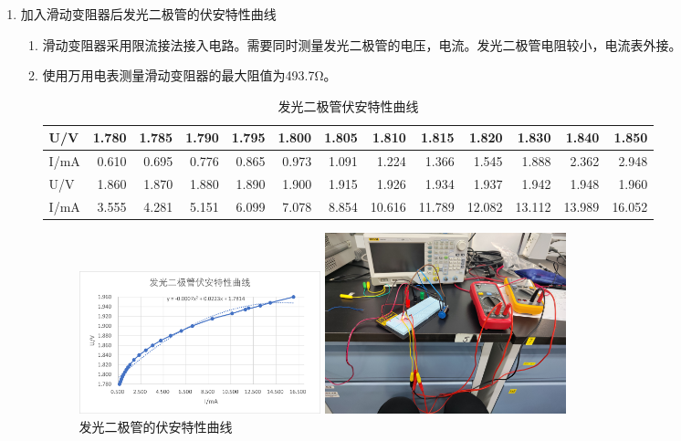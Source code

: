 \documentclass[11pt]{article}
\begin{document}
\begin{enumerate}
    \item 加入滑动变阻器后发光二极管的伏安特性曲线
    \begin{enumerate}
        \item 滑动变阻器采用限流接法接入电路。需要同时测量发光二极管的电压，电流。发光二极管电阻较小，电流表外接。
        \item 使用万用电表测量滑动变阻器的最大阻值为493.7Ω。
        \begin{table}[H]
          \centering
          \caption{发光二极管伏安特性曲线}
          \vspace*{1em}
            \begin{tabular}{|l|r|r|r|r|r|r|r|r|r|r|r|r|}\hline
            U/V   & 1.780  & 1.785  & 1.790  & 1.795  & 1.800  & 1.805  & 1.810  & 1.815  & 1.820  & 1.830  & 1.840  & 1.850  \\\hline
            I/mA  & 0.610  & 0.695  & 0.776  & 0.865  & 0.973  & 1.091  & 1.224  & 1.366  & 1.545  & 1.888  & 2.362  & 2.948  \\\hline
            U/V   & 1.860  & 1.870  & 1.880  & 1.890  & 1.900  & 1.915  & 1.926  & 1.934  & 1.937  & 1.942  & 1.948  & 1.960  \\\hline
            I/mA  & 3.555  & 4.281  & 5.151  & 6.099  & 7.078  & 8.854  & 10.616  & 11.789  & 12.082  & 13.112  & 13.989  & 16.052  \\\hline
            \end{tabular}%
        \end{table}%
        \begin{figure}[H]
            \centering
            \begin{minipage}[H]{0.49\linewidth}
                \includegraphics[width=7cm]{Fig/3.png}
                \caption{发光二极管的伏安特性曲线}
            \end{minipage}
            \begin{minipage}[H]{0.49\linewidth}
                \includegraphics[width=7cm]{Fig/4.jpg}

\end{minipage}
\end{figure}
\end{enumerate}
\end{enumerate}
\end{document}
